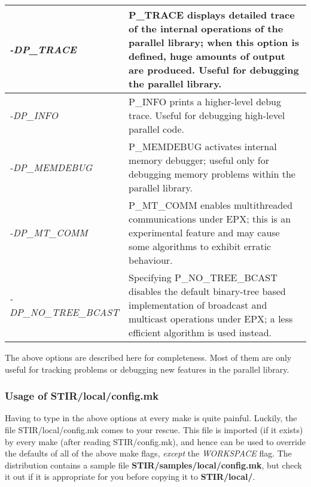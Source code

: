\documentclass{article}
\begin{document}
\begin{longtable}{|p{\MakeTableFirstCol}|p{\MakeTableSecondCol}|}
\hline
{\raggedright \textit{-DP\_TRACE}} & 
{\raggedright P\_TRACE displays detailed trace of the internal operations of 
the parallel library; when this option is defined, huge amounts 
of output are produced. Useful for debugging the parallel library.} \\
\hline
{\raggedright \textit{-DP\_INFO}} & 
{\raggedright P\_INFO prints a higher-level debug trace. Useful for debugging 
high-level parallel code.} \\
\hline
{\raggedright \textit{-DP\_MEMDEBUG}} & 
{\raggedright P\_MEMDEBUG activates internal memory debugger; useful only for 
debugging memory problems within the parallel library.} \\
\hline
{\raggedright \textit{-DP\_MT\_COMM}} & 
{\raggedright P\_MT\_COMM enables multithreaded communications under EPX; this 
is an experimental feature and may cause some algorithms to exhibit 
erratic behaviour.} \\
\hline
{\raggedright \textit{-DP\_NO\_TREE\_BCAST}} & 
{\raggedright Specifying P\_NO\_TREE\_BCAST disables the default binary-tree 
based implementation of broadcast and multicast operations under 
EPX; a less efficient algorithm is used instead. \linebreak
} \\
\hline
\end{longtable}


The above options are described here for completeness. Most of 
them are only useful for tracking problems or debugging new features 
in the parallel library.
\subsubsection{
Usage of STIR/local/config.mk}
\label{sec:local_config.mk}

Having to type in the above options at every make is quite painful. 
Luckily, the file STIR/local/config.mk comes to your rescue. 
This file is imported (if it exists) by every make (after reading 
STIR/config.mk), and hence can be used to override the defaults 
of all of the above make flags, \textit{except} the \textit{WORKSPACE} flag. 
The distribution contains a sample file \textbf{STIR/samples/local/config.mk}, 
but check it out if it is appropriate for you before copying 
it to \textbf{STIR/local/}.
\end{document}
